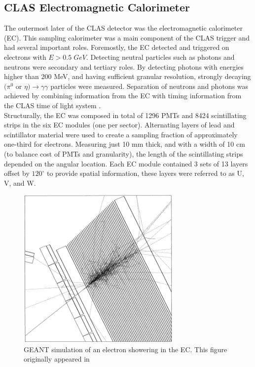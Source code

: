 \subsection{CLAS Electromagnetic Calorimeter}
The outermost later of the CLAS detector was the electromagnetic calorimeter (EC).  This sampling calorimeter was a main component of the CLAS trigger and had several important roles.  Foremostly, the EC detected and triggered on electrons with $E > 0.5 \; GeV$.  Detecting neutral particles such as photons and neutrons were secondary and tertiary roles.  By detecting photons with energies higher than 200 MeV, and having sufficient granular resolution, strongly decaying $(\pi^0$ or $\eta) \rightarrow \gamma \gamma$ particles were measured.  Separation of neutrons and photons was achieved by combining information from the EC with timing information from the CLAS time of light system \cite{hardware-amarian:2001}.  \\
Structurally, the EC was composed in total of 1296 PMTs and 8424 scintillating strips in the six EC modules (one per sector).  Alternating layers of lead and scintillator material were used to create a sampling fraction of approximately one-third for electrons.  Measuring just 10 mm thick, and with a width of 10 cm (to balance cost of PMTs and granularity), the length of the scintillating strips depended on the angular location.  Each EC module contained 3 sets of 13 layers offset by $120^\circ$ to provide spatial information, these layers were referred to as U, V, and W.  

\begin{figure}
	\centering
		\includegraphics[width=8cm]{image/diagrams/ec-shower-geant.png}
		\caption{GEANT simulation of an electron showering in the EC.  This figure originally appeared in \cite{hardware-amarian:2001}}
\end{figure}